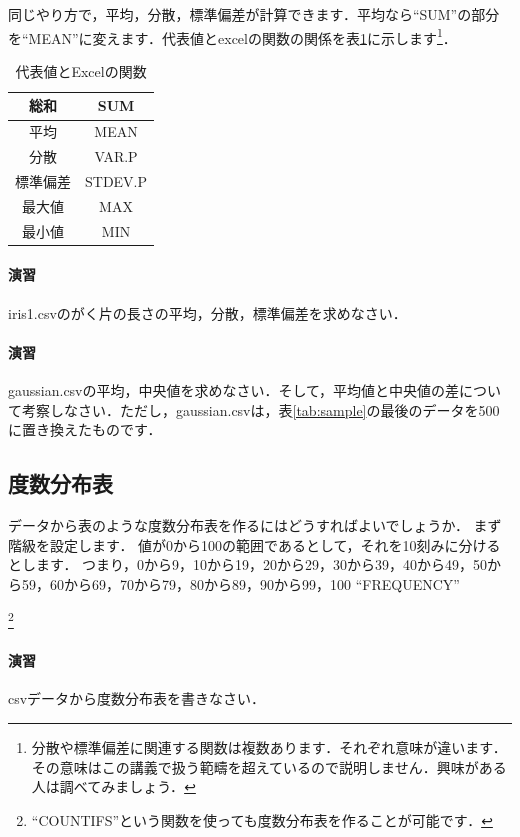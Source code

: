 \documentclass[12pt, a4j]{jsreport}
\begin{document}
同じやり方で，平均，分散，標準偏差が計算できます．平均なら``SUM''の部分を``MEAN''に変えます．代表値とexcelの関数の関係を表\ref{tab:funcs}に示します\footnote{分散や標準偏差に関連する関数は複数あります．それぞれ意味が違います．その意味はこの講義で扱う範疇を超えているので説明しません．興味がある人は調べてみましょう．}．

\begin{table}[htb]
    \centering
    \caption{代表値とExcelの関数}
    \begin{tabular}{|c|c|}
      \hline
      総和     & SUM\\ \hline
      平均     & MEAN\\ \hline
      分散     & VAR.P\\ \hline
      標準偏差 & STDEV.P \\ \hline
      最大値   & MAX \\ \hline
      最小値   & MIN \\ \hline
    \end{tabular}
    \label{tab:funcs}
\end{table}

\paragraph{演習}
iris1.csvのがく片の長さの平均，分散，標準偏差を求めなさい．

\paragraph{演習}
gaussian.csvの平均，中央値を求めなさい．そして，平均値と中央値の差について考察しなさい．ただし，gaussian.csvは，表\ref{tab:sample}の最後のデータを500に置き換えたものです．

\subsection{度数分布表}
\label{sec:hist}

データから表のような度数分布表を作るにはどうすればよいでしょうか．
まず階級を設定します．
値が0から100の範囲であるとして，それを10刻みに分けるとします．
つまり，0から9，10から19，20から29，30から39，40から49，50から59，60から69，70から79，80から89，90から99，100
``FREQUENCY''

\footnote{``COUNTIFS''という関数を使っても度数分布表を作ることが可能です．}

\paragraph{演習}
csvデータから度数分布表を書きなさい．
\end{document}
